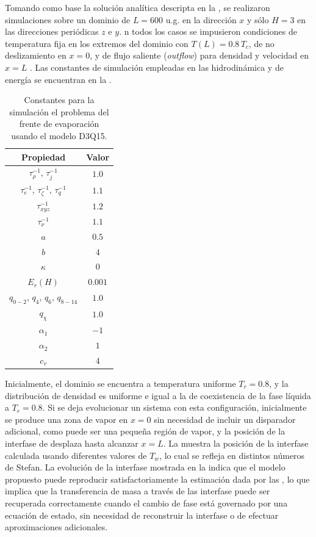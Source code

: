 Tomando como base la soluci\'on anal\'itica descripta en la , se realizaron simulaciones sobre un dominio de $L=600$ u.g. en la direcci\'on $x$ y s\'olo $H=3$ en las direcciones peri\'odicas $z$ e $y$. n todos los casos se impusieron condiciones de temperatura fija en los extremos del dominio con $T(L) = 0.8 \, T_c$, de no deslizamiento en $x=0$, y de flujo saliente (\emph{outflow}) para densidad y velocidad en $x=L$ \cite{lou_evaluation_2013}. Las constantes de simulaci\'on empleadas en las \lbe{} hidrodin\'amica y de energ\'ia se encuentran en la . 

\begin{table}[ht]
	\centering
    \begin{tabular}{c c}
	    \toprule
        \bf Propiedad & \bf Valor \\
        \midrule
        $\tau_{\rho}^{-1}$, $\tau_{j}^{-1}$ & $1.0$ \\
        $\tau_{e}^{-1}$, $\tau_{\zeta}^{-1}$, $\tau_{q}^{-1}$ & $1.1$ \\
        $\tau_{xyz}^{-1}$ & $1.2$ \\
        $\tau_{\nu}^{-1}$ & $1.1$ \\
		$a$ & $0.5$ \\
		$b$ & $4$ \\
		$\kappa$   & 0 \\
		$E_r (H)$  & $0.001$ \\
		$q_{0-2}$, $q_4$, $q_{6}$, $q_{8-14}$ & $1.0$ \\
		$q_{\chi}$ & $1.0$ \\
		$\alpha_1$ & $-1$ \\
		$\alpha_2$ & $1$ \\
		$c_v$      & $4$ \\
        \bottomrule
	\end{tabular}
	\caption{Constantes para la simulaci\'on el problema del frente de evaporaci\'on usando el modelo D3Q15.}
	\label{tab:stefan3D_prop}
\end{table} 


Inicialmente, el dominio se encuentra a temperatura uniforme $T_r = 0.8$, y la distribuci\'on de densidad es uniforme e igual a la de coexistencia de la fase l\'iquida a $T_r = 0.8$. Si se deja evolucionar un sistema con esta configuraci\'on, inicialmente se produce una zona de vapor en $x=0$ sin necesidad de incluir un disparador adicional, como puede ser una peque\~na regi\'on de vapor, y la posici\'on de la interfase de desplaza hasta alcanzar $x=L$. La  muestra la posici\'on de la interfase calculada usando diferentes valores de $T_w$, lo cual se refleja en distintos n\'umeros de Stefan. La evoluci\'on de la interfase mostrada en la  indica que el modelo propuesto puede reproducir satisfactoriamente la estimaci\'on dada por las , lo que implica que la transferencia de masa a trav\'es de las interfase puede ser recuperada correctamente cuando el cambio de fase est\'a governado por una ecuaci\'on de estado, sin necesidad de reconstruir la interfase o de efectuar aproximaciones adicionales.

